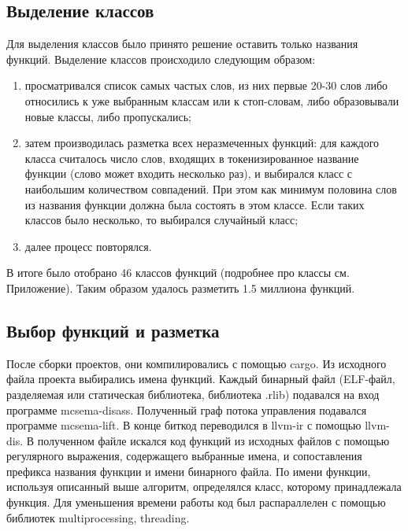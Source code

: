 \subsection{Выделение классов}
Для выделения классов было принято решение оставить только названия функций.
Выделение классов происходило следующим образом:
\begin{enumerate}
    \item просматривался список самых частых слов, из них первые 20-30 слов либо относились к уже выбранным классам или к стоп-словам, либо образовывали новые классы, либо пропускались;
    \item затем производилась разметка всех неразмеченных функций: для каждого класса считалось число слов, входящих в токенизированное название функции (слово может входить несколько раз), и выбирался класс с наибольшим количеством совпадений. При этом как минимум половина слов из названия функции должна была состоять в этом классе. Если таких классов было несколько, то выбирался случайный класс;
    \item далее процесс повторялся. 
\end{enumerate}

В итоге было отобрано 46 классов функций (подробнее про классы см. Приложение). Таким образом удалось разметить 1.5 миллиона функций.

\subsection{Выбор функций и разметка}
После сборки проектов, они компилировались с помощью cargo. Из исходного файла проекта выбирались имена функций. Каждый бинарный файл (ELF-файл, разделяемая или статическая библиотека, библиотека .rlib) подавался на вход программе mcsema-disass. Полученный граф потока управления подавался программе mcsema-lift. В конце биткод переводился в llvm-ir с помощью llvm-dis. В полученном файле искался код функций из исходных файлов с помощью регулярного выражения, содержащего выбранные имена, и сопоставления префикса названия функции и имени бинарного файла. По имени функции, используя описанный выше алгоритм, определялся класс, которому принадлежала функция. Для уменьшения времени работы код был распараллелен с помощью библиотек multiprocessing, threading.

